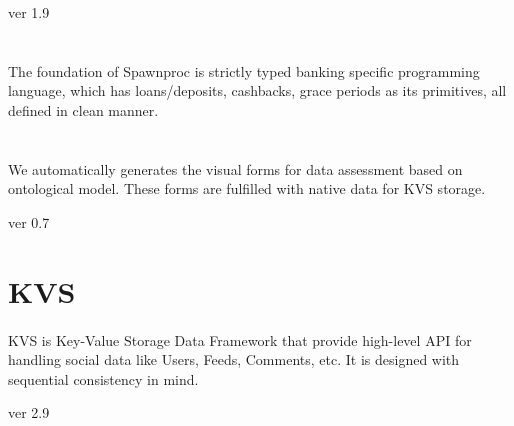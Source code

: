 \documentclass[11pt]{article}
\begin{document}
 ver 1.9


\section*{}
\paragraph{}
The foundation of Spawnproc is strictly typed banking specific
programming language, which has loans/deposits, cashbacks,
grace periods as its primitives, all defined in clean manner.


\section*{}
\paragraph{}
We automatically generates the visual forms for data assessment
based on ontological model. These forms are fulfilled with native
data for KVS storage.

 ver 0.7


\section*{KVS}
\paragraph{}
KVS is Key-Value Storage Data Framework that provide high-level API for handling
social data like Users, Feeds, Comments, etc. It is designed with sequential consistency in mind.

 ver 2.9
\end{document}
